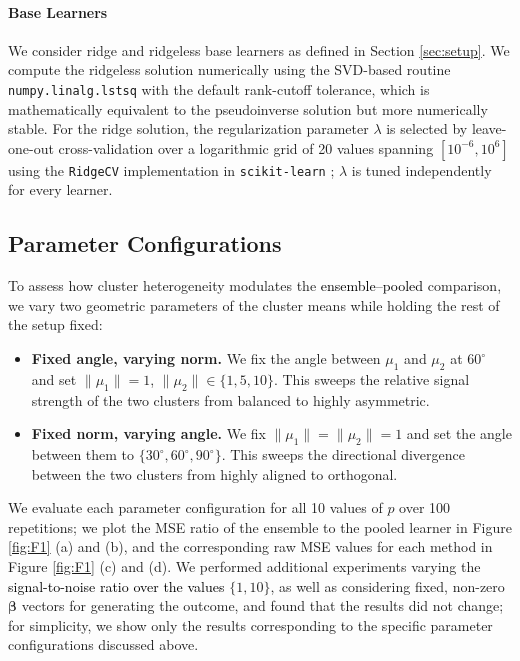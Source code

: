 \documentclass{article}
\theoremstyle{plain}
\theoremstyle{remark}
\begin{document}
\paragraph{Base Learners}
We consider ridge and ridgeless base learners as defined in Section \ref{sec:setup}. We compute the ridgeless solution numerically using the SVD-based routine \texttt{numpy.linalg.lstsq} with the default rank-cutoff tolerance, which is mathematically equivalent to the pseudoinverse solution but more numerically stable. For the ridge solution, the regularization parameter $\lambda$ is selected by leave-one-out cross-validation over a logarithmic grid of 20 values spanning $[10^{-6}, 10^{6}]$ using the \texttt{RidgeCV} implementation in \texttt{scikit-learn} \citep{pedregosa2011scikit}; $\lambda$ is tuned independently for every learner. 



\subsection{Parameter Configurations}
\label{sec:sim-hetero}

To assess how cluster heterogeneity modulates the \textcolor{black}{ensemble--pooled} comparison, we vary two geometric parameters of the cluster means while holding the rest of the setup fixed:
\begin{itemize}
    \item \textbf{Fixed angle, varying norm.} We fix the angle between $\mu_1$ and $\mu_2$ at $60^\circ$ and set $\|\mu_1\| = 1$, $\|\mu_2\| \in \{1, 5, 10\}$. This sweeps the relative signal strength of the two clusters from balanced to highly asymmetric.
    \item \textbf{Fixed norm, varying angle.} We fix $\|\mu_1\| = \|\mu_2\| = 1$ and set the angle between them to $\{30^\circ, 60^\circ, 90^\circ\}$. This sweeps the directional divergence between the two clusters from highly aligned to orthogonal.
\end{itemize}

We evaluate each parameter configuration for all 10 values of $p$ over 100 repetitions; we plot the MSE ratio of the ensemble to the pooled learner in Figure \ref{fig:F1} (a) and (b), and the corresponding raw MSE values for each method in Figure \ref{fig:F1} (c) and (d). We performed additional experiments varying the \textcolor{black}{signal-to-noise ratio over the values} $\{1, 10\}$, as well as considering fixed, non-zero $\boldsymbol{\beta}$ vectors for generating the outcome, and found that the results did not change; for simplicity, we show only the results corresponding to the specific parameter configurations discussed above.
\end{document}
